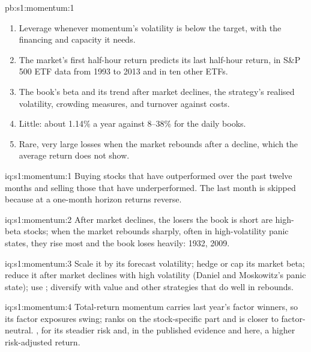 \begin{solution}{pb:s1:momentum:1}
\begin{enumerate}
\item Leverage whenever momentum's volatility is below the target, with the financing and capacity it needs.
\item The market's first half-hour return predicts its last half-hour return, in S\&P 500 ETF data from 1993 to 2013 and in ten other ETFs.
\item The book's beta and its trend after market declines, the strategy's realised volatility, crowding measures, and turnover against costs.
\item Little: about 1.14\% a year against 8--38\% for the daily books.
\item Rare, very large losses when the market rebounds after a decline, which the average return does not show.
\end{enumerate}
\end{solution}

\begin{solution}{iq:s1:momentum:1}
Buying stocks that have outperformed over the past twelve months and selling those that have underperformed. The last month is skipped because at a
one-month horizon returns reverse.
\end{solution}

\begin{solution}{iq:s1:momentum:2}
After market declines, the losers the book is short are high-beta stocks; when the market rebounds sharply, often in high-volatility panic states, they rise
most and the book loses heavily: 1932, 2009.
\end{solution}

\begin{solution}{iq:s1:momentum:3}
Scale it by its forecast volatility; hedge or cap its market beta; reduce it after market declines with high volatility (Daniel and Moskowitz's panic state);
use ; diversify with value and other strategies that do well in rebounds.
\end{solution}

\begin{solution}{iq:s1:momentum:4}
Total-return momentum carries last year's factor winners, so its factor exposures swing;  ranks on the stock-specific part and is closer to
factor-neutral. , for its steadier risk and, in the published evidence and here, a higher risk-adjusted return.
\end{solution}

